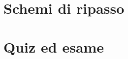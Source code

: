 \documentclass[11pt,a4paper]{report}
\begin{document}
\part{Schemi di ripasso}




\part{Quiz ed esame}





\appendix

\end{document}
